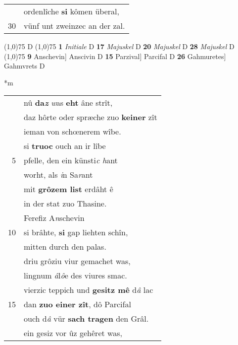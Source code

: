 \documentclass[8pt,a4paper,notitlepage]{article}
\begin{document}
\begin{table}[ht]
\begin{minipage}[t]{0.5\linewidth}
\begin{tabular}{rl}
 & ordenlîche \textbf{si} kômen überal,\\ 
30 & vünf unt zweinzec an der zal.\\ 
\end{tabular}
\scriptsize
\line(1,0){75} \newline
D \newline
\line(1,0){75} \newline
\textbf{1} \textit{Initiale} D  \textbf{17} \textit{Majuskel} D  \textbf{20} \textit{Majuskel} D  \textbf{28} \textit{Majuskel} D  \newline
\line(1,0){75} \newline
\textbf{9} Anschevin] Anscivin D \textbf{15} Parzival] Parcifal D \textbf{26} Gahmuretes] Gahmvrets D \newline
\end{minipage}
\hspace{0.5cm}
\begin{minipage}[t]{0.5\linewidth}
\small
\begin{center}*m
\end{center}
\begin{tabular}{rl}
 & nû \textbf{da\textit{z}} \textit{w}as \textbf{eht} âne strît,\\ 
 & daz hôrte oder spræche zuo \textbf{keiner} zît\\ 
 & ieman von schœnerem wîbe.\\ 
 & si \textbf{truoc} ouch an ir lîbe\\ 
5 & pfelle, den ein künsti\textit{c h}ant\\ 
 & worht, als \textit{i}n Sa\textit{r}ant\\ 
 & mit \textbf{grôzem list} erdâht ê\\ 
 & in der stat zuo Thasine.\\ 
 & Ferefiz A\textit{n}schevin\\ 
10 & si brâhte, \textbf{si} gap liehten schîn,\\ 
 & mitten durch den palas.\\ 
 & driu grôziu viur gemachet was,\\ 
 & lingnum \textit{â}l\textit{ô}e des viures smac.\\ 
 & vierzic teppich und \textbf{gesitz mê} d\textit{â} lac\\ 
15 & dan \textbf{zuo einer zît}, dô Parcifal\\ 
 & ouch d\textit{â} vür \textbf{sach tragen} den Grâl.\\ 
 & ein gesiz vor ûz gehêret was,\\ 

\end{tabular}
\end{minipage}
\end{table}
\end{document}
